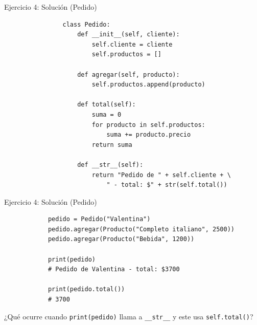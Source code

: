 \documentclass{beamer}
\begin{document}
    \begin{frame}[fragile,t]{Ejercicio 4: Solución (Pedido)}
        \begin{verbatim}
                class Pedido:
                    def __init__(self, cliente):
                        self.cliente = cliente
                        self.productos = []
                
                    def agregar(self, producto):
                        self.productos.append(producto)
                
                    def total(self):
                        suma = 0
                        for producto in self.productos:
                            suma += producto.precio
                        return suma
                
                    def __str__(self):
                        return "Pedido de " + self.cliente + \
                            " - total: $" + str(self.total())
        \end{verbatim}
    \end{frame}
    
    \begin{frame}[fragile,t]{Ejercicio 4: Solución (Pedido)}
        \begin{verbatim}
            pedido = Pedido("Valentina")
            pedido.agregar(Producto("Completo italiano", 2500))
            pedido.agregar(Producto("Bebida", 1200))
            
            print(pedido)
            # Pedido de Valentina - total: $3700
            
            print(pedido.total())
            # 3700
        \end{verbatim}
        \pause
        ¿Qué ocurre cuando \texttt{print(pedido)} llama a \texttt{__str__} y este usa \texttt{self.total()}?
    \end{frame}
    
\end{document}
